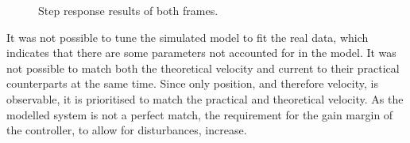 \documentclass[../../main]{subfiles}
\begin{document}
\begin{figure}[H]
        \centering
				\def\svgwidth{0.47\columnwidth}
				\def\svgwidth{0.47\columnwidth}
				\caption{Step response results of both frames.}
				\label{fig:validation_steptuning}
\end{figure}
It was not possible to tune the simulated model to fit the real data,
which indicates that there are some parameters not accounted for in the model.
It was not possible to match both the theoretical velocity and current to their practical counterparts at the same time. Since only position, and therefore velocity, is observable, it is prioritised to match the practical and theoretical velocity.
As the modelled system is not a perfect match, the requirement for the gain margin of the controller, to allow for disturbances, increase.
\end{document}
